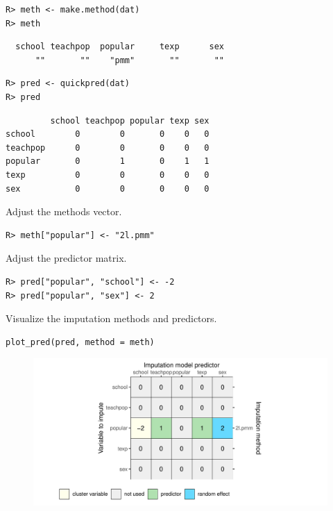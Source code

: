 \documentclass[
  article]{jss}
\begin{document}
\begin{verbatim}
R> meth <- make.method(dat)
R> meth
\end{verbatim}

\begin{verbatim}
  school teachpop  popular     texp      sex 
      ""       ""    "pmm"       ""       "" 
\end{verbatim}

\begin{verbatim}
R> pred <- quickpred(dat)
R> pred
\end{verbatim}

\begin{verbatim}
         school teachpop popular texp sex
school        0        0       0    0   0
teachpop      0        0       0    0   0
popular       0        1       0    1   1
texp          0        0       0    0   0
sex           0        0       0    0   0
\end{verbatim}

Adjust the methods vector.

\begin{verbatim}
R> meth["popular"] <- "2l.pmm"
\end{verbatim}

Adjust the predictor matrix.

\begin{verbatim}
R> pred["popular", "school"] <- -2
R> pred["popular", "sex"] <- 2
\end{verbatim}

Visualize the imputation methods and predictors.

\begin{verbatim}
plot_pred(pred, method = meth)
\end{verbatim}

\begin{figure}[t]

{\centering \includegraphics{manuscript_files/figure-pdf/unnamed-chunk-12-1.pdf}

}

\end{figure}
\end{document}
